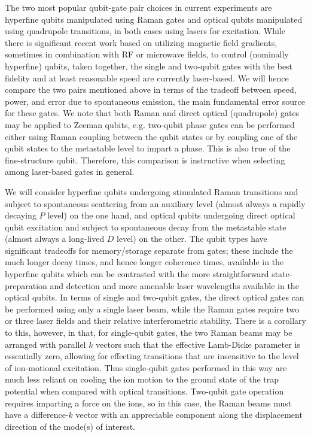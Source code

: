 \documentclass[%
12pt,
 amsmath,amssymb,
]{revtex4-2}
\begin{document}
The two most popular qubit-gate pair choices in current experiments are hyperfine qubits manipulated using Raman gates and optical qubits manipulated using quadrupole transitions, in both cases using lasers for excitation.  While there is significant recent work based on utilizing magnetic field gradients, sometimes in combination with RF or microwave fields, to control (nominally hyperfine) qubits, taken together, the single and two-qubit gates with the best fidelity and at least reasonable speed are currently laser-based.  We will hence compare the two pairs mentioned above in terms of the tradeoff between speed, power, and error due to spontaneous emission, the main fundamental error source for these gates.  We note that both Raman and direct optical (quadrupole) gates may be applied to Zeeman qubits, e.g. two-qubit phase gates can be performed either using Raman coupling between the qubit states or by coupling one of the qubit states to the metastable level to impart a phase.  This is also true of the fine-structure qubit.  Therefore, this comparison is instructive when selecting among laser-based gates in general.

We will consider hyperfine qubits undergoing stimulated Raman transitions and subject to spontaneous scattering from an auxiliary level (almost always a rapidly decaying $P$ level) on the one hand, and optical qubits undergoing direct optical qubit excitation and subject to spontaneous decay from the metastable state (almost always a long-lived $D$ level) on the other.  The qubit types have significant tradeoffs for memory/storage separate from gates; these include the much longer decay times, and hence longer coherence times, available in the hyperfine qubits which can be contrasted with the more straightforward state-preparation and detection and more amenable laser wavelengths available in the optical qubits.  In terms of single and two-qubit gates, the direct optical gates can be performed using only a single laser beam, while the Raman gates require two or three laser fields and their relative interferometric stability.  There is a corollary to this, however, in that, for single-qubit gates, the two Raman beams may be arranged with parallel $k$ vectors such that the effective Lamb-Dicke parameter is essentially zero, allowing for effecting transitions that are insensitive to the level of ion-motional excitation.  Thus single-qubit gates performed in this way are much less reliant on cooling the ion motion to the ground state of the trap potential when compared with optical transitions.  Two-qubit gate operation requires imparting a force on the ions, so in this case, the Raman beams must have a difference-$k$ vector with an appreciable component along the displacement direction of the mode(s) of interest.
\end{document}
